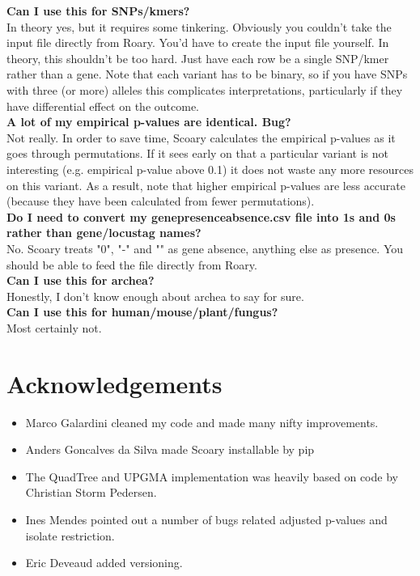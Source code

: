 \documentclass{article}
\begin{document}
    \textbf{Can I use this for SNPs/kmers?} \\

    In theory yes, but it requires some tinkering. Obviously you couldn't take the input file directly from Roary. You'd have to create the input file yourself. In theory, this shouldn't be too hard. Just have each row be a single SNP/kmer rather than a gene. Note that each variant has to be binary, so if you have SNPs with three (or more) alleles this complicates interpretations, particularly if they have differential effect on the outcome. \\
    
    \textbf{A lot of my empirical p-values are identical. Bug?} \\

    Not really. In order to save time, Scoary calculates the empirical p-values as it goes through permutations. If it sees early on that a particular variant is not interesting (e.g. empirical p-value above 0.1) it does not waste any more resources on this variant. As a result, note that higher empirical p-values are less accurate (because they have been calculated from fewer permutations). \\
    
    \textbf{Do I need to convert my gene\textunderscore presence\textunderscore absence.csv file into 1s and 0s rather than gene/locus\textunderscore tag names?} \\

    No. Scoary treats "0", "-" and "" as gene absence, anything else as presence. You should be able to feed the file directly from Roary. \\
    
    \textbf{Can I use this for archea?} \\

    Honestly, I don't know enough about archea to say for sure. \\
    
    \textbf{Can I use this for human/mouse/plant/fungus?} \\

    Most certainly not. \\

  \section{Acknowledgements}
    \begin{itemize}
      \item Marco Galardini cleaned my code and made many nifty improvements.
      \item Anders Goncalves da Silva made Scoary installable by pip
      \item The QuadTree and UPGMA implementation was heavily based on code by Christian Storm Pedersen.
      \item Ines Mendes pointed out a number of bugs related adjusted p-values and isolate restriction.
      \item Eric Deveaud added versioning.
    \end{itemize}
\end{document}
